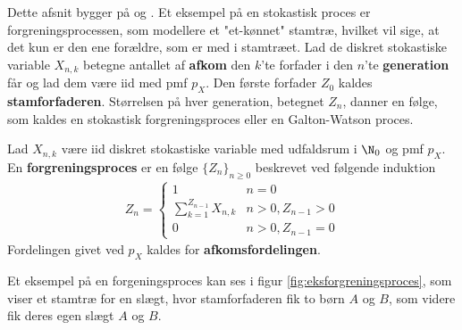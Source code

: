 Dette afsnit bygger på \cite{sandsynlighedsBog} og \cite{grimsandsynlighedsBog}.
Et eksempel på en stokastisk proces er forgreningsprocessen, som modellere et "et-kønnet" stamtræ, hvilket vil sige, at det kun er den ene forældre, som er med i stamtræet. 
Lad de diskret stokastiske variable $X_{n,k}$ betegne antallet af \textbf{afkom} den $k$'te forfader i den $n$'te \textbf{generation} får og lad dem være iid med pmf $p_X$. Den første forfader $Z_0$ kaldes \textbf{stamforfaderen}.
Størrelsen på hver generation, betegnet $Z_n$, danner en følge, som kaldes en stokastisk forgreningsproces eller en Galton-Watson proces.
\begin{defn}\label{def:forgreningsproces}
Lad $X_{n,k}$ være iid diskret stokastiske variable med udfaldsrum i $\N_0$ og pmf $p_X$. En \textbf{forgreningsproces} er en følge $\{Z_n\}_{n\geq 0}$ beskrevet ved følgende induktion
\begin{align*}
    Z_n=\begin{cases}
        1&n=0\\
        \sum_{k=1}^{Z_{n-1}}X_{n,k}&n>0,Z_{n-1}>0\\
        0&n>0,Z_{n-1}=0
        \end{cases}
\end{align*}
Fordelingen givet ved $p_X$ kaldes for \textbf{afkomsfordelingen}.
\end{defn}

Et eksempel på en forgeningsproces kan ses i figur \ref{fig:eksforgreningsproces}, som viser et stamtræ for en slægt, hvor stamforfaderen fik to børn $A$ og $B$, som videre fik deres egen slægt $A$ og $B$.

